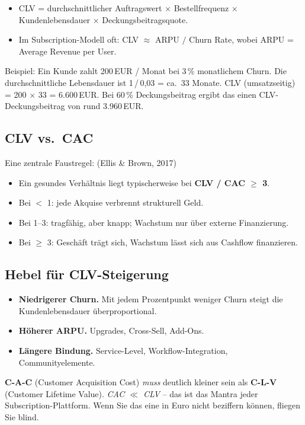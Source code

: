 \documentclass[11pt,a4paper,oneside]{article}
\newcommand{\caveatfontfallback}{\itshape}
\newcommand\caveatfont{\caveatfontfallback}%
\newcommand{\akzent}[1]{{\caveatfont\color{lpAmber}#1}}
\newcommand{\quelle}[1]{{\footnotesize\color{lpGray}(#1)}}
\begin{document}
\begin{itemize}
  \item CLV = durchschnittlicher Auftragswert $\times$ Bestellfrequenz $\times$ Kundenlebensdauer $\times$ Deckungsbeitragsquote.
  \item Im Subscription-Modell oft: CLV $\approx$ ARPU $/$ Churn Rate, wobei ARPU = Average Revenue per User.
\end{itemize}

\noindent Beispiel: Ein Kunde zahlt 200\,EUR / Monat bei 3\,\% monatlichem Churn. Die durchschnittliche Lebensdauer ist 1\,/\,0{,}03 = ca.\ 33 Monate. CLV (umsatzseitig) = 200 $\times$ 33 = 6.600\,EUR. Bei 60\,\% Deckungsbeitrag ergibt das einen CLV-Deckungsbeitrag von rund 3.960\,EUR.

\subsection{CLV vs.\ CAC}

Eine zentrale Faustregel: \quelle{Ellis \& Brown, 2017}

\begin{itemize}
  \item Ein gesundes Verhältnis liegt typischerweise bei \textbf{CLV / CAC $\geq$ 3}.
  \item Bei $<$ 1: jede Akquise verbrennt strukturell Geld.
  \item Bei 1--3: tragfähig, aber knapp; Wachstum nur über externe Finanzierung.
  \item Bei $\geq$ 3: Geschäft trägt sich, Wachstum lässt sich aus Cashflow finanzieren.
\end{itemize}

\subsection{Hebel für CLV-Steigerung}

\begin{itemize}
  \item \textbf{Niedrigerer Churn.} Mit jedem Prozentpunkt weniger Churn steigt die Kundenlebensdauer überproportional.
  \item \textbf{Höherer ARPU.} Upgrades, Cross-Sell, Add-Ons.
  \item \textbf{Längere Bindung.} Service-Level, Workflow-Integration, Communityelemente.
\end{itemize}

\begin{eselsbox}[Eselsbrücke: \akzent{C-A-C $\ll$ C-L-V}]
\textbf{C-A-C} (Customer Acquisition Cost) \emph{muss} deutlich kleiner sein als \textbf{C-L-V} (Customer Lifetime Value). \emph{CAC $\ll$ CLV} -- das ist das Mantra jeder Subscription-Plattform. Wenn Sie das eine in Euro nicht beziffern können, fliegen Sie blind.
\end{eselsbox}
\end{document}
